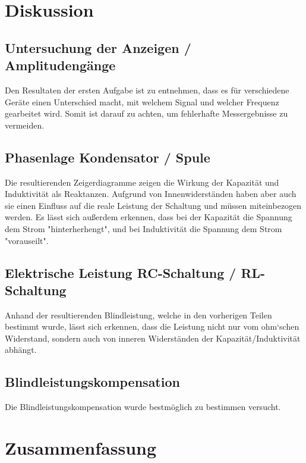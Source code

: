 \documentclass[12pt,a4paper,twoside]{article}
\begin{document}
\section{Diskussion} %

\subsection{Untersuchung der Anzeigen / Amplitudengänge}

Den Resultaten der ersten Aufgabe ist zu entnehmen, dass es für verschiedene Geräte einen Unterschied macht, mit welchem Signal und welcher Frequenz gearbeitet wird.
Somit ist darauf zu achten, um fehlerhafte Messergebnisse zu vermeiden.


\subsection{Phasenlage Kondensator / Spule}

Die resultierenden Zeigerdiagramme zeigen die Wirkung der Kapazität und Induktivität als Reaktanzen. 
Aufgrund von Innenwiderständen haben aber auch sie einen Einfluss auf die reale Leistung der Schaltung und müssen miteinbezogen werden.
Es lässt sich außerdem erkennen, dass bei der Kapazität die Spannung dem Strom "hinterherhengt", und bei Induktivität die Spannung dem Strom "vorauseilt".

\subsection{Elektrische Leistung RC-Schaltung / RL-Schaltung}

Anhand der resultierenden Blindleistung, welche in den vorherigen Teilen bestimmt wurde, lässt sich erkennen, dass die Leistung nicht nur vom ohm`schen Widerstand, sondern auch von inneren Widerständen der Kapazität/Induktivität abhängt.

\subsection{Blindleistungskompensation}

Die Blindleistungskompensation wurde bestmöglich zu bestimmen versucht.  


\section{Zusammenfassung} %
\end{document}
